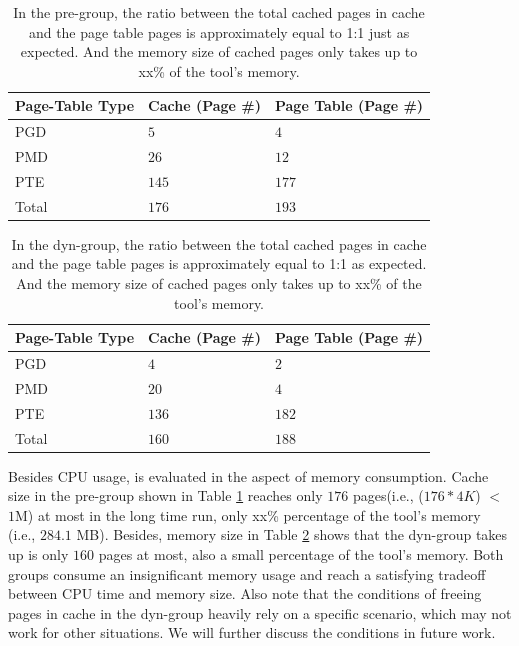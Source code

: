 \begin{table}[!ht]
\footnotesize
\begin{center}
\begin{tabular}{|l|l|l|}
\hline
{\textbf{Page-Table Type}} & {\textbf{Cache (Page \#)}} & {\textbf{Page Table (Page \#)}} \\ \hline
PGD & $5$  & $4$ \\ \hline
PMD & $26$ & $12$ \\ \hline
PTE & $145$ & $177$ \\ \hline
Total & $176$ & $193$ \\ \hline
\end{tabular}
\end{center}
\caption{In the pre-\name group, the ratio between the total cached pages in cache and the page table pages is approximately equal to 1:1 just as expected. And the memory size of cached pages only takes up to xx\% of the tool's memory.}
\label{tab:prePGpool}
\end{table}

\begin{table}[!ht]
\footnotesize
\begin{center}
\begin{tabular}{|l|l|l|}
\hline
{\textbf{Page-Table Type}} & {\textbf{Cache (Page \#)}} & {\textbf{Page Table (Page \#)}} \\ \hline
PGD & $4$  & $2$ \\ \hline
PMD & $20$ & $4$  \\ \hline
PTE & $136$ & $182$ \\ \hline
Total & $160$ & $188$ \\ \hline
\end{tabular}
\end{center}
\caption{In the dyn-\name group, the ratio between the total cached pages in cache and the page table pages is approximately equal to 1:1 as expected. And the memory size of cached pages only takes up to xx\% of the tool's memory.}
\label{tab:dynPGpool}
\end{table}

Besides CPU usage, \name is evaluated in the aspect of memory consumption. Cache size in the pre-\name group shown in Table \ref{tab:prePGpool} reaches only $176$ pages(i.e., ($176 * 4K$) $<$ $1$M) at most in the long time run, only xx\% percentage of the tool's memory (i.e., $284.1$ MB). Besides, memory size in Table \ref{tab:dynPGpool} shows that the dyn-\name group takes up is only $160$ pages at most, also a small percentage of the tool's memory. Both groups consume an insignificant memory usage and reach a satisfying tradeoff between CPU time and memory size. Also note that the conditions of freeing pages in cache in the dyn-\name group heavily rely on a specific scenario, which may not work for other situations. We will further discuss the conditions in future work.

